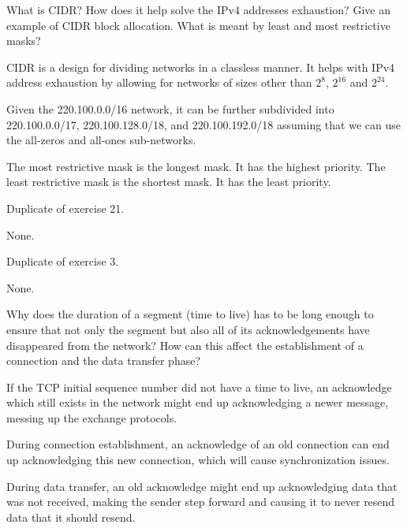 \begin{Exercise}
What is CIDR? How does it help solve the IPv4 addresses exhaustion?
Give an example of CIDR block allocation.
What is meant by least and most restrictive masks?
\end{Exercise}
\begin{Answer}
CIDR is a design for dividing networks in a classless manner.
It helps with IPv4 address exhaustion by allowing for networks of sizes other than \(2^{8}\), \(2^{16}\) and \(2^{24}\).

Given the 220.100.0.0/16 network, it can be further subdivided into 220.100.0.0/17, 220.100.128.0/18, and 220.100.192.0/18 assuming that we can use the all-zeros and all-ones sub-networks.

The most restrictive mask is the longest mask. It has the highest priority.
The least restrictive mask is the shortest mask. It has the least priority.
\end{Answer}

\begin{Exercise}
Duplicate of exercise 21.
\end{Exercise}
\begin{Answer}
None.
\end{Answer}

\begin{Exercise}
Duplicate of exercise 3.
\end{Exercise}
\begin{Answer}
None.
\end{Answer}

\begin{Exercise}
Why does the duration of a segment (time to live) has to be long enough to ensure that not only the segment but also all of its acknowledgements have disappeared from the network?
How can this affect the establishment of a connection and the data transfer phase?
\end{Exercise}
\begin{Answer}
If the TCP initial sequence number did not have a time to live, an acknowledge which still exists in the network might end up acknowledging a newer message, messing up the exchange protocols.

During connection establishment, an acknowledge of an old connection can end up acknowledging this new connection, which will cause synchronization issues.

During data transfer, an old acknowledge might end up acknowledging data that was not received, making the sender step forward and causing it to never resend data that it should resend.
\end{Answer}

